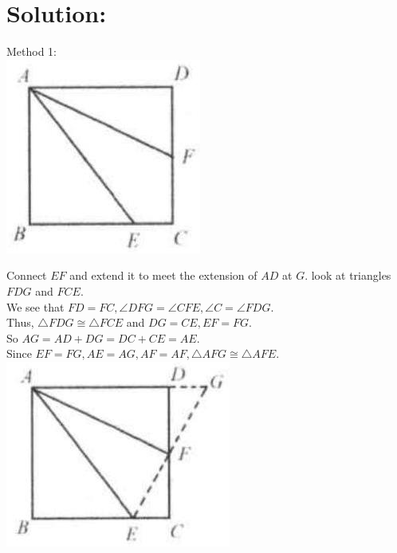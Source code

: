 \documentclass[10pt]{article}
\begin{document}
\section*{Solution:}
Method 1:\\
\includegraphics[max width=\textwidth, center]{2025_04_17_97bc1f7e44d93c271a88g-060}

Connect \(E F\) and extend it to meet the extension of \(A D\) at \(G\). look at triangles \(F D G\) and \(F C E\).\\
We see that \(F D=F C, \angle D F G=\angle C F E, \angle C=\angle F D G\).\\
Thus, \(\triangle F D G \cong \triangle F C E\) and \(D G=C E, E F=F G\).\\
So \(A G=A D+D G=D C+C E=A E\).\\
Since \(E F=F G, A E=A G, A F=A F, \triangle A F G \cong \triangle A F E\).\\
\includegraphics[max width=\textwidth, center]{2025_04_17_97bc1f7e44d93c271a88g-060(1)}
\end{document}
